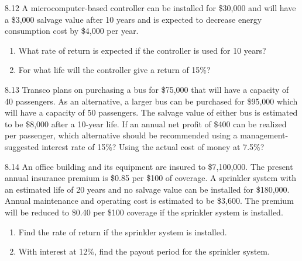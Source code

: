 \begin{exsol@solution}{}
\end{exsol@solution}
\begin{exsol@exercise}{8.12}
    \label{sea-8-12}
        A microcomputer-based controller can be installed for \$30,000 and will have a \$3,000 salvage value after 10 years and is expected to decrease energy consumption cost by \$4,000 per year.
        \begin{enumerate}[label=\alph*)]
            \item What rate of return is expected if the controller is used for 10 years?
            \item For what life will the controller give a return of 15\%?
        \end{enumerate}
\end{exsol@exercise}
\begin{exsol@solution}{}
\end{exsol@solution}
\begin{exsol@exercise}{8.13}
    \label{sea-8-13}
        Transco plans on purchasing a bus for \$75,000 that will have a capacity of 40 passengers. As an alternative, a larger bus can be purchased for \$95,000 which will have a capacity of 50 passengers. The salvage value of either bus is estimated to be \$8,000 after a 10-year life. If an annual net profit of \$400 can be realized per passenger, which alternative should be recommended using a management-suggested interest rate of 15\%? Using the actual cost of money at 7.5\%?
\end{exsol@exercise}
\begin{exsol@solution}{}
\end{exsol@solution}
\begin{exsol@exercise}{8.14}
    \label{sea-8-14}
        An office building and its equipment are insured to \$7,100,000. The present annual insurance premium is \$0.85 per \$100 of coverage. A sprinkler system with an estimated life of 20 years and no salvage value can be installed for \$180,000. Annual maintenance and operating cost is estimated to be \$3,600. The premium will be reduced to \$0.40 per \$100 coverage if the sprinkler system is installed.
        \begin{enumerate}[label=\alph*)]
            \item Find the rate of return if the sprinkler system is installed.
            \item With interest at 12\%, find the payout period for the sprinkler system.
        \end{enumerate}
\end{exsol@exercise}
